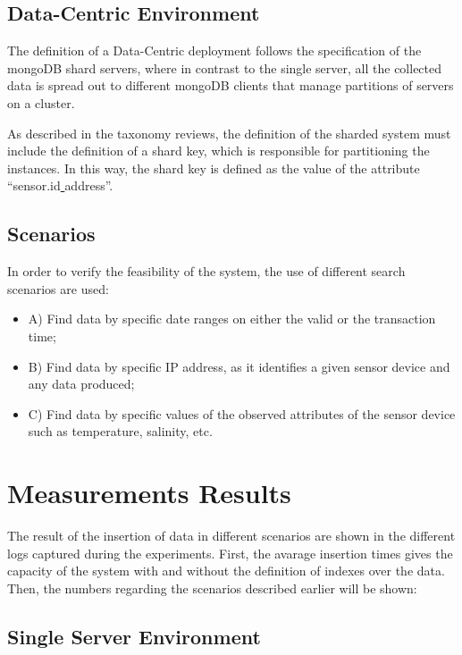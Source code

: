 \subsection{Data-Centric Environment}

The definition of a Data-Centric deployment follows the specification of the
mongoDB shard servers, where in contrast to the single server, all the
collected data is spread out to different mongoDB clients that manage
partitions of servers on a cluster. 

As described in the taxonomy reviews, the definition of the sharded system must
include the definition of a shard key, which is responsible for partitioning
the instances. In this way, the shard key is defined as the value of the
attribute ``sensor.id\underline{ }address''.

\subsection{Scenarios}

In order to verify the feasibility of the system, the use of different search
scenarios are used:

\begin{itemize}
  \item A) Find data by specific date ranges on either the valid or the
  transaction time;
  \item B) Find data by specific IP address, as it identifies a given sensor
  device and any data produced;
  \item C) Find data by specific values of the observed attributes of the sensor
  device such as temperature, salinity, etc.
\end{itemize}

\section{Measurements Results}

The result of the insertion of data in different scenarios are shown in the
different logs captured during the experiments. First, the avarage insertion
times gives the capacity of the system with and without the definition of
indexes over the data. Then, the numbers regarding the scenarios described
earlier will be shown:

\subsection{Single Server Environment}

